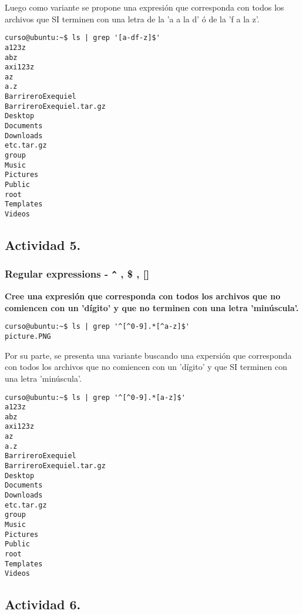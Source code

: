 \documentclass[a4paper,11pt,spanish]{article} %
\newenvironment{myscriptlisting}
{\begin{list}{}{\setlength{\leftmargin}{1em}}\item\scriptsize\bfseries}
{\end{list}}
\begin{document}
Luego como variante se propone una expresión que corresponda con todos los archivos que SI 
terminen con una letra de la 'a a la d' ó de la 'f a la z'.

\begin{myscriptlisting}
 \begin{verbatim}
curso@ubuntu:~$ ls | grep '[a-df-z]$'
a123z
abz
axi123z
az
a.z
BarrireroExequiel
BarrireroExequiel.tar.gz
Desktop
Documents
Downloads
etc.tar.gz
group
Music
Pictures
Public
root
Templates
Videos
\end{verbatim}
\end{myscriptlisting}


\subsection{Actividad 5.}

\subsubsection{Regular expressions - \texttt{\^} , \$ , []}

\textbf{Cree una expresión que corresponda con todos los 
archivos que no comiencen con un 'dígito' y que no terminen con una letra 'minúscula'.}

\begin{myscriptlisting}
 \begin{verbatim}
curso@ubuntu:~$ ls | grep '^[^0-9].*[^a-z]$'
picture.PNG
\end{verbatim}
\end{myscriptlisting}

Por su parte, se presenta una variante buscando una expersión que corresponda con todos los 
archivos que no comiencen con un 'dígito' y que SI terminen con una letra 'minúscula'.

\begin{myscriptlisting}
 \begin{verbatim}
curso@ubuntu:~$ ls | grep '^[^0-9].*[a-z]$'
a123z
abz
axi123z
az
a.z
BarrireroExequiel
BarrireroExequiel.tar.gz
Desktop
Documents
Downloads
etc.tar.gz
group
Music
Pictures
Public
root
Templates
Videos
\end{verbatim}
\end{myscriptlisting}


\subsection{Actividad 6.}
\end{document}
